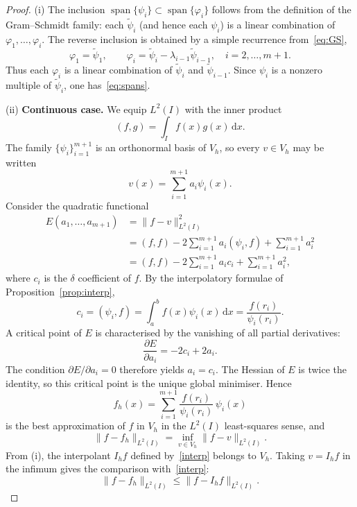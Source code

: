 \documentclass[final,3p,times]{elsarticle}
\theoremstyle{plain}
\theoremstyle{definition}
\theoremstyle{remark}
\newcommand{\dziti}{\ensuremath{\delta}\text{-Ziti}}
\newcommand{\spanop}{\operatorname{span}}
\newcommand{\dd}{\mathrm{d}}
\begin{document}
\begin{proof}
(i) The inclusion
$\spanop\{\psi_i\}\subset\spanop\{\varphi_i\}$ follows from the definition of
the Gram--Schmidt family: each $\widetilde\psi_i$ (and hence each $\psi_i$)
is a linear combination of $\varphi_1,\dots,\varphi_i$. The reverse inclusion
is obtained by a simple recurrence from~\eqref{eq:GS},
\begin{equation}
\label{eq:inverse}
\varphi_1=\widetilde\psi_1,
\qquad
\varphi_i=\widetilde\psi_i-\lambda_{i-1}\widetilde\psi_{i-1},
\quad i=2,\dots,m+1.
\end{equation}
Thus each $\varphi_i$ is a linear combination of $\widetilde\psi_i$ and
$\widetilde\psi_{i-1}$. Since $\psi_i$ is a nonzero multiple of
$\widetilde\psi_i$, one has~\eqref{eq:spans}.

(ii) \textbf{Continuous case.}
We equip $L^2(I)$ with the inner product
\begin{equation}
\label{eq:ip}
(f,g)=\int_I f(x)g(x)\,\dd x.
\end{equation}
The family $\{\psi_i\}_{i=1}^{m+1}$ is an orthonormal basis of $V_h$, so every
$v\in V_h$ may be written
\begin{equation}
v(x)=\sum_{i=1}^{m+1}a_i\psi_i(x).
\end{equation}
Consider the quadratic functional
\begin{align*}
E(a_1,\dots,a_{m+1})
&=\lVert f-v\rVert_{L^2(I)}^2 \\
&=(f,f)-2\sum_{i=1}^{m+1}a_i(\psi_i,f)+\sum_{i=1}^{m+1}a_i^2 \\
&=(f,f)-2\sum_{i=1}^{m+1}a_i c_i+\sum_{i=1}^{m+1}a_i^2,
\end{align*}
where $c_i$ is the \dziti{} coefficient of $f$. By the interpolatory formulae
of Proposition~\ref{prop:interp},
\begin{equation}
\label{eq:ci-id}
c_i
=(\psi_i,f)
=\int_a^b f(x)\psi_i(x)\,\dd x
=\frac{f(r_i)}{\psi_i(r_i)}.
\end{equation}
A critical point of $E$ is characterised by the vanishing of all partial
derivatives:
\begin{equation}
\frac{\partial E}{\partial a_i}=-2c_i+2a_i.
\end{equation}
The condition $\partial E/\partial a_i=0$ therefore yields $a_i=c_i$. The
Hessian of $E$ is twice the identity, so this critical point is the unique
global minimiser. Hence
\begin{equation}
f_h(x)=\sum_{i=1}^{m+1}\frac{f(r_i)}{\psi_i(r_i)}\,\psi_i(x)
\end{equation}
is the best approximation of $f$ in $V_h$ in the $L^2(I)$ least-squares sense,
and
\begin{equation}
\lVert f-f_h\rVert_{L^2(I)}
=\inf_{v\in V_h}\lVert f-v\rVert_{L^2(I)}.
\end{equation}
From (i), the interpolant $I_h f$ defined by~\eqref{interp} belongs to $V_h$.
Taking $v=I_h f$ in the infimum gives the comparison with~\eqref{interp}:
\begin{equation}
\lVert f-f_h\rVert_{L^2(I)}
\le
\lVert f-I_h f\rVert_{L^2(I)}.
\end{equation}


\end{proof}
\end{document}
